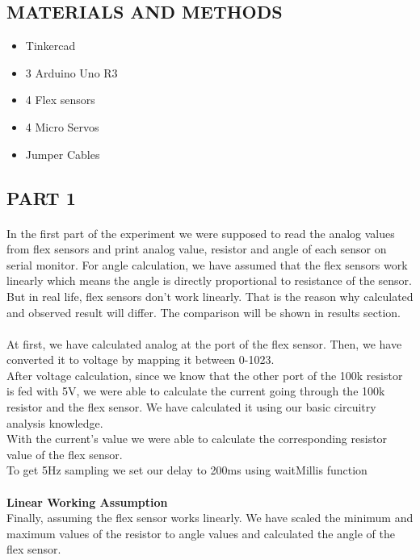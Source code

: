 \documentclass[pdftex,12pt,a4paper]{article}
\begin{document}
\begin{flushleft}
\section{MATERIALS AND METHODS}
\begin{itemize}
    \item Tinkercad
    \item 3 Arduino Uno R3 
    \item 4 Flex sensors
    \item 4 Micro Servos
    \item Jumper Cables
\end{itemize}

\subsection{PART 1}
\paragraph{}
In the first part of the experiment we were supposed to read the analog values from flex sensors and print analog value, resistor and angle of each sensor on serial monitor. For angle calculation, we have assumed that the flex sensors work linearly which means the angle is directly proportional to resistance of the sensor. But in real life, flex sensors don't work linearly. That is the reason why calculated and observed result will differ. The comparison will be shown in results section.
\paragraph{}
At first, we have calculated analog at the port of the flex sensor. Then, we have converted it to voltage by mapping it between 0-1023.\\
After voltage calculation, since we know that the other port of the 100k resistor is fed with 5V, we were able to calculate the current going through the 100k resistor and the flex sensor. We have calculated it using our basic circuitry analysis knowledge.\\
With the current's value we were able to calculate the corresponding resistor value of the flex sensor.\\
To get 5Hz sampling we set our delay to 200ms using waitMillis function\\

\paragraph{}
\textbf{Linear Working Assumption}\\
Finally, assuming the flex sensor works linearly. We have scaled the minimum and maximum values of the resistor to angle values and calculated the angle of the flex sensor.
 

\end{flushleft}
\end{document}
